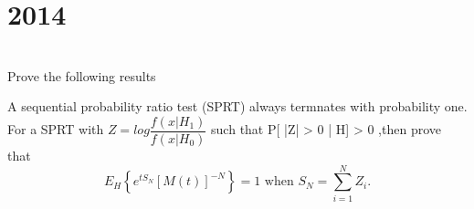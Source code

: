 \section*{2014}
\vspace{-.5cm}
\hrulefill \smallskip\\
 Prove the following results \begin{tasks}
\task A sequential probability ratio test (SPRT) always termnates with probability one.
\task For a SPRT with $Z = log\dfrac{f(x|H_1)}{f(x|H_0)}$ such that P[ |Z| > 0 | H] > 0 ,then prove that \[E_H \left\{e^{tS_N}[M(t)]^{-N} \right\} = 1 \text{ when } S_N = \sum_{i=1}^N Z_i. \]
\end{tasks}